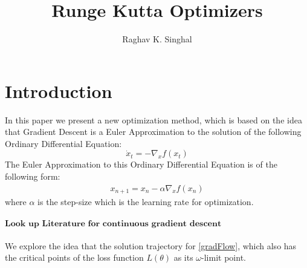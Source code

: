 \documentclass[12pt,twoside]{article}
\date{}   %
\begin{document}
\title{Runge Kutta Optimizers}

\author{Raghav K. Singhal}

\maketitle

\section{Introduction}
In this paper we present a new optimization method, which is based on the idea that Gradient Descent is a Euler Approximation to the solution of the following Ordinary Differential Equation:
\begin{equation}\label{gradFlow}
\dot{x}_t = -\nabla_{x}f(x_t)
\end{equation}
The Euler Approximation to this Ordinary Differential Equation is of the following form:
\begin{align*}
x_{n+1} =  x_n - \alpha \nabla_{x}f(x_n)
\end{align*}
where $\alpha$ is the step-size which is the learning rate for optimization.
\\
\\
$\textbf{Look up Literature for continuous gradient descent}$
\\
\\
We explore the idea that the solution trajectory for \eqref{gradFlow}, which also has the critical points of the loss function $L(\theta)$ as its $\omega$-limit point.
\end{document}
